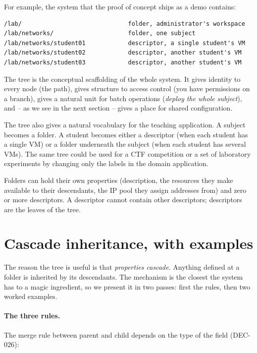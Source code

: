 For example, the system that the proof of concept ships as a demo
contains:

\begin{verbatim}
/lab/                              folder, administrator's workspace
/lab/networks/                     folder, one subject
/lab/networks/student01            descriptor, a single student's VM
/lab/networks/student02            descriptor, another student's VM
/lab/networks/student03            descriptor, another student's VM
\end{verbatim}

The tree is the conceptual scaffolding of the whole system. It
gives identity to every node (the path), gives structure to access
control (you have permissions on a branch), gives a natural unit
for batch operations (\emph{deploy the whole subject}), and -- as
we see in the next section -- gives a place for shared
configuration.

The tree also gives a natural vocabulary for the teaching
application. A subject becomes a folder. A student becomes either a
descriptor (when each student has a single VM) or a folder
underneath the subject (when each student has several VMs). The same
tree could be used for a CTF competition or a set of laboratory
experiments by changing only the labels in the domain application.

Folders can hold their own properties (description, the resources
they make available to their descendants, the IP pool they assign
addresses from) and zero or more descriptors. A descriptor cannot
contain other descriptors; descriptors are the leaves of the tree.

\section{Cascade inheritance, with examples}
\label{sec:herencia}

The reason the tree is useful is that \emph{properties cascade}.
Anything defined at a folder is inherited by its descendants. The
mechanism is the closest the system has to a magic ingredient, so
we present it in two passes: first the rules, then two worked
examples.

\paragraph{The three rules.}
The merge rule between parent and child depends on the type of the
field (DEC-026):


